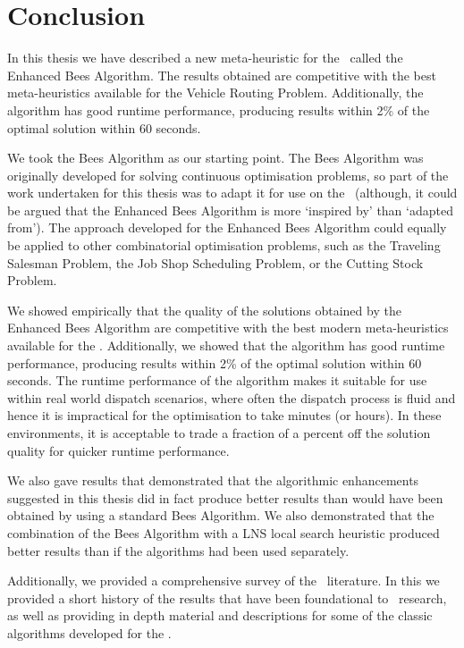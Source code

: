 
\chapter{Conclusion}
\label{chap:conclusion}

In this thesis we have described a new meta-heuristic for the \VRP\ called the Enhanced Bees Algorithm. The results obtained are competitive with the best meta-heuristics available for the Vehicle Routing Problem. Additionally, the algorithm has good runtime performance, producing results within 2\% of the optimal solution within 60 seconds.

We took the Bees Algorithm as our starting point. The Bees Algorithm was originally developed for solving continuous optimisation problems, so part of the work undertaken for this thesis was to adapt it for use on the \VRP\ (although, it could be argued that the Enhanced Bees Algorithm is more `inspired by' than `adapted from'). The approach developed for the Enhanced Bees Algorithm could equally be applied to other combinatorial optimisation problems, such as the Traveling Salesman Problem, the Job Shop Scheduling Problem, or the Cutting Stock Problem.

We showed empirically that the quality of the solutions obtained by the Enhanced Bees Algorithm are competitive with the best modern meta-heuristics available for the \VRP. Additionally, we showed that the algorithm has good runtime performance, producing results within 2\% of the optimal solution within 60 seconds. The runtime performance of the algorithm makes it suitable for use within real world dispatch scenarios, where often the dispatch process is fluid and hence it is impractical for the optimisation to take minutes (or hours). In these environments, it is acceptable to trade a fraction of a percent off the solution quality for quicker runtime performance.

We also gave results that demonstrated that the algorithmic enhancements suggested in this thesis did in fact produce better results than would have been obtained by using a standard Bees Algorithm. We also demonstrated that the combination of the Bees Algorithm with a LNS local search heuristic produced better results than if the algorithms had been used separately.

Additionally, we provided a comprehensive survey of the \VRP\ literature. In this we provided a short history of the results that have been foundational to \VRP\ research, as well as providing in depth material and descriptions for some of the classic algorithms developed for the \VRP. 


